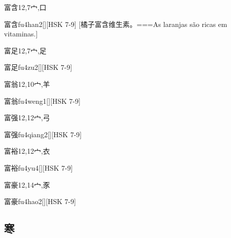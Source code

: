 \begin{Entry}{富含}{12,7}{⼧,⼝}
  \begin{Phonetics}{富含}{fu4han2}[][HSK 7-9]
    [橘子富含维生素。===As laranjas são ricas em vitaminas.]
  \end{Phonetics}
\end{Entry}

\begin{Entry}{富足}{12,7}{⼧,⾜}
  \begin{Phonetics}{富足}{fu4zu2}[][HSK 7-9]
  \end{Phonetics}
\end{Entry}

\begin{Entry}{富翁}{12,10}{⼧,⽺}
  \begin{Phonetics}{富翁}{fu4weng1}[][HSK 7-9]
  \end{Phonetics}
\end{Entry}

\begin{Entry}{富强}{12,12}{⼧,⼸}
  \begin{Phonetics}{富强}{fu4qiang2}[][HSK 7-9]
  \end{Phonetics}
\end{Entry}

\begin{Entry}{富裕}{12,12}{⼧,⾐}
  \begin{Phonetics}{富裕}{fu4yu4}[][HSK 7-9]
  \end{Phonetics}
\end{Entry}

\begin{Entry}{富豪}{12,14}{⼧,⾗}
  \begin{Phonetics}{富豪}{fu4hao2}[][HSK 7-9]
  \end{Phonetics}
\end{Entry}

\subsection*{寒}

